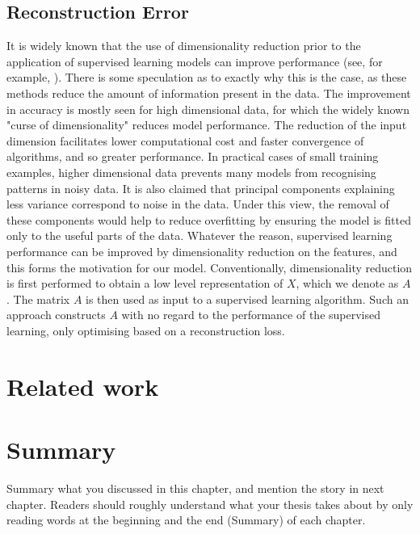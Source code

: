 \subsection{Reconstruction Error}
\label{reconerror}
 It is widely known that the use of dimensionality reduction prior to the application of supervised learning models can improve performance (see, for example, \cite{HOWLEY2006363}). There is some speculation as to exactly why this is the case, as these methods reduce the amount of information present in the data. The improvement in accuracy is mostly seen for high dimensional data, for which the widely known "curse of dimensionality" reduces model performance. The reduction of the input dimension facilitates lower computational cost and faster convergence of algorithms, and so greater performance. In practical cases of small training examples, higher dimensional data prevents many models from recognising patterns in noisy data. It is also claimed that principal components explaining less variance correspond to noise in the data. Under this view, the removal of these components would help to reduce overfitting by ensuring the model is fitted only to the useful parts of the data. Whatever the reason, supervised learning performance can be improved by dimensionality reduction on the features, and this forms the motivation for our model. Conventionally, dimensionality reduction is first performed to obtain a low level representation of $X$, which we denote as $A$. The matrix $A$ is then used as input to a supervised learning algorithm. Such an approach constructs $A$ with no regard to the performance of the supervised learning, only optimising based on a reconstruction loss. 




\section{Related work}
\label{sec:relatedwork}




\section{Summary}
Summary what you discussed in this chapter, and mention the story in next
chapter. Readers should roughly understand what your thesis takes about by only reading
words at the beginning and the end (Summary) of each chapter.




